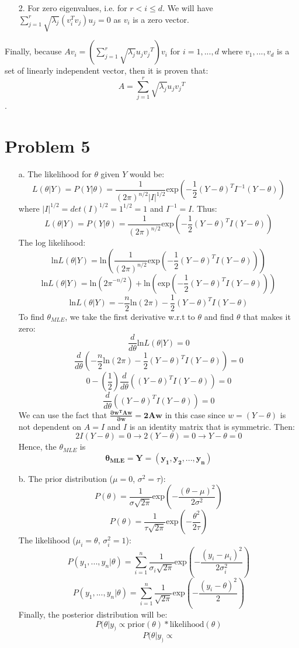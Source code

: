 \documentclass[twoside]{homework}
\begin{document}
\begin{itemize}
\begin{itemize}
        \item[2.] For zero eigenvalues, i.e. for $r<i\leq{d}$. We will have $\sum_{j=1}^r\sqrt{{\lambda}_j}(v_i^Tv_j)u_j = 0$ as $v_i$ is a zero vector.
    \end{itemize}
    Finally, because $Av_i=(\sum_{j=1}^r\sqrt{{\lambda}_j}u_j{v_j}^T)v_i$ for $i=1,...,d$ where $v_1,...,v_d$ is a set of linearly independent vector, then it is proven that:
    $$A=\sum_{j=1}^r\sqrt{{\lambda}_j}u_j{v_j}^T$$.
\end{itemize}
\newpage

\section*{Problem 5}
\begin{itemize}
    \item [a.] The likelihood for $\theta$ given $Y$ would be:
    $$L(\theta|Y)=P(Y|\theta)=\frac{1}{(2\pi)^{n/2}|I|^{1/2}}\text{exp}(-\frac{1}{2}(Y-\theta)^TI^{-1}(Y-\theta))$$
    where $|I|^{1/2}=det(I)^{1/2}=1^{1/2}=1$ and $I^{-1}=I$. Thus:
    $$L(\theta|Y)=P(Y|\theta)=\frac{1}{(2\pi)^{n/2}}\text{exp}(-\frac{1}{2}(Y-\theta)^TI(Y-\theta))$$
    The log likelihood:
    $$\text{ln}L(\theta|Y)=\text{ln}(\frac{1}{(2\pi)^{n/2}}\text{exp}(-\frac{1}{2}(Y-\theta)^TI(Y-\theta)))$$
    $$\text{ln}L(\theta|Y)=\text{ln}({2\pi}^{-n/2})+\text{ln}(\text{exp}(-\frac{1}{2}(Y-\theta)^TI(Y-\theta)))$$
    $$\text{ln}L(\theta|Y)=-\frac{n}{2}\text{ln}(2\pi)-\frac{1}{2}(Y-\theta)^TI(Y-\theta)$$
    To find $\theta_{MLE}$, we take the first derivative w.r.t to $\theta$ and find $\theta$ that makes it zero:
    $$\frac{d}{d\theta}\text{ln}L(\theta|Y)=0$$
    $$\frac{d}{d\theta}(-\frac{n}{2}\text{ln}(2\pi)-\frac{1}{2}(Y-\theta)^TI(Y-\theta))=0$$
    $$0-(\frac{1}{2})\frac{d}{d\theta}((Y-\theta)^TI(Y-\theta))=0$$
    $$\frac{d}{d\theta}((Y-\theta)^TI(Y-\theta))=0$$
    We can use the fact that $\mathbf{ \frac{\partial w^T A w}{\partial w} = 2Aw}$ in this case since $w=(Y-\theta)$ is not dependent on $A=I$ and $I$ is an identity matrix that is symmetric. Then:
    $$2I(Y-\theta)=0 \xrightarrow{} 2(Y-\theta)=0 \xrightarrow{} Y-\theta=0$$
    Hence, the $\theta_{MLE}$ is
    $$\boldsymbol{\theta_{MLE}=Y=(y_1, y_2, ..., y_n)}$$
    \item [b.] The prior distribution ($\mu=0$, $\sigma^2=\tau$):
    $$P(\theta)=\frac{1}{\sigma\sqrt{2\pi}}\text{exp}(-\frac{(\theta-\mu)^2}{2\sigma^2})$$
    $$P(\theta)=\frac{1}{\tau\sqrt{2\pi}}\text{exp}(-\frac{\theta^2}{2\tau})$$
    The likelihood ($\mu_i=\theta$, $\sigma_i^2=1$):
    $$P(y_1,...,y_n|\theta)=\sum_{i=1}^n\frac{1}{\sigma_i\sqrt{2\pi}}\text{exp}(-\frac{(y_i-\mu_i)^2}{2\sigma_i^2})$$
    $$P(y_1,...,y_n|\theta)=\sum_{i=1}^n\frac{1}{\sqrt{2\pi}}\text{exp}(-\frac{(y_i-\theta)^2}{2})$$
    Finally, the posterior distribution will be:
    $$P(\theta|y_)\propto\text{prior}(\theta)*\text{likelihood}(\theta)$$
    $$P(\theta|y_)\propto$$
\end{itemize}
\end{document}
